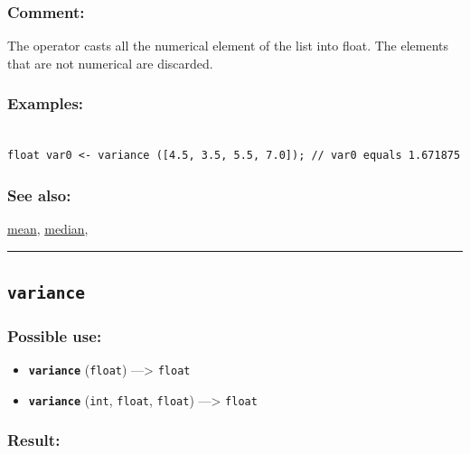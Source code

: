 \documentclass[]{book}
\providecommand{\tightlist}{%
  \setlength{\itemsep}{0pt}\setlength{\parskip}{0pt}}
\theoremstyle{definition}
\theoremstyle{definition}
\theoremstyle{definition}
\theoremstyle{remark}
\begin{document}
\subsubsection{Comment:}\label{comment-105}

The operator casts all the numerical element of the list into float. The
elements that are not numerical are discarded.

\subsubsection{Examples:}\label{examples-378}

\begin{verbatim}
 
float var0 <- variance ([4.5, 3.5, 5.5, 7.0]); // var0 equals 1.671875
\end{verbatim}

\subsubsection{See also:}\label{see-also-217}

\href{operators-i-to-m.html\#mean}{mean},
\href{operators-i-to-m.html\#median}{median},

\begin{center}\rule{0.5\linewidth}{\linethickness}\end{center}

\subsection{\texorpdfstring{\texttt{variance}}{variance}}\label{variance-1}

\subsubsection{Possible use:}\label{possible-use-549}

\begin{itemize}
\tightlist
\item
  \textbf{\texttt{variance}} (\texttt{float}) ---\textgreater{}
  \texttt{float}
\item
  \textbf{\texttt{variance}} (\texttt{int}, \texttt{float},
  \texttt{float}) ---\textgreater{} \texttt{float}
\end{itemize}

\subsubsection{Result:}\label{result-529}
\end{document}
